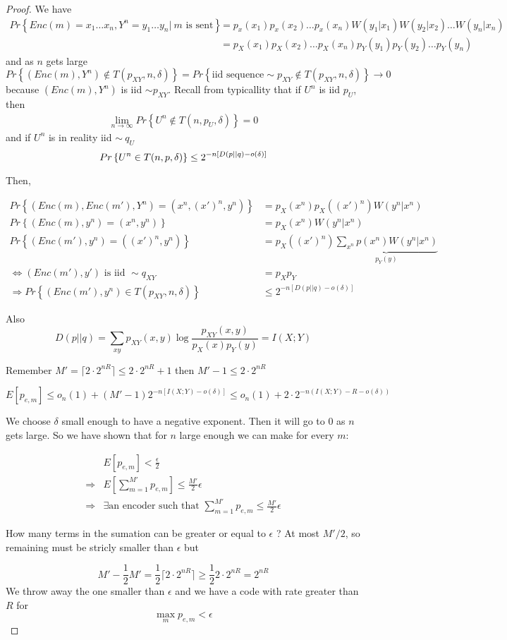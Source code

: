 \documentclass{article}
\theoremstyle{definition} %
\renewcommand{\Pr}[1]{Pr\left\{#1\right\}}
\newcommand{\Ex}[1]{E\left[#1\right]}
\begin{document}
\begin{proof}
  We have
  \begin{align*}
    \Pr{Enc(m) = x_1\dots x_n, Y^n=y_1 \dots y_n |~m \text{ is sent}}
    &= p_x(x_1)p_x(x_2)\dots p_x(x_n)W(y_1|x_1)W(y_2|x_2) \dots W(y_n|x_n) \\
    &= p_X(x_1)p_X(x_2)\dots p_X(x_n)p_Y(y_1)p_Y(y_2)\dots p_Y(y_n)
  \end{align*}
  and as $n$ gets large
  \[
    \Pr{(Enc(m), Y^n) \not \in T (p_{XY}, n, \delta)} = \Pr{\text{iid sequence} \sim p_{XY} \not \in T(p_{XY}, n, \delta)} \to 0
  \]
because $(Enc(m), Y^n)$ is iid $\sim p_{XY}$. Recall from typicallity that if $U^n$ is iid $p_U$, then
\begin{align*}
  \lim_{n\to\infty} \Pr{U^n \not \in T(n, p_U, \delta)} = 0
\end{align*}
and if $U^n$ is in reality iid $\sim~q_U$
\[
  \Pr{U^n \in T(n,p,\delta)} \leq 2^{-n[D(p||q) - o(\delta)]}\\
\]

Then,

\begin{align*}
  \Pr{(Enc(m), Enc(m'), Y^n) = (x^n, (x')^n, y^n)} &= p_X(x^n) p_X((x')^n)W(y^n|x^n)\\
  \Pr{(Enc(m), y^n) = (x^n, y^n)} &= p_X(x^n)W(y^n|x^n)\\
  \Pr{(Enc(m'), y^n) = ((x')^n, y^n)} &= p_X((x')^n) \underbrace{\sum_{x^n} p(x^n)W(y^n|x^n)}_{p_Y(y)}\\
  \iff (Enc(m'), y') \text{ is iid } \sim q_{XY} &= p_Xp_Y\\
  \Rightarrow \Pr{(Enc(m'), y^n) \in T(p_{XY}, n, \delta)} &\leq 2^{-n[D(p||q)- o(\delta)]}
\end{align*}

Also
\[
  D(p||q) = \sum_{xy} p_{XY}(x,y) \log \frac {p_{XY}(x,y)} {p_X(x) p_Y(y)} = I(X;Y)
\]


Remember $M' = \lceil2 \cdot 2^{nR} \rceil \leq 2 \cdot 2^{nR} + 1$ then $M'-1 \leq 2 \cdot 2^{nR}$

\[
  \Ex{p_{e,m}} \leq o_n(1) + (M' -1)  2^{-n[I(X;Y)- o(\delta)]}
  \leq o_n(1) + 2 \cdot 2^{-n(I(X;Y) - R - o(\delta))}
\]

We choose $\delta$ small enough to have a negative exponent. Then it will go to 0 as $n$ gets large. So we have shown that for $n $ large enough we can make for every $m$:

\begin{align*}
  &\Ex{p_{e,m}} < \frac \epsilon 2\\
  \Rightarrow& \Ex{\sum_{m=1}^{M'} p_{e,m}} \leq \frac{M'} 2 \epsilon\\
  \Rightarrow& \exists \text{an encoder such that } \sum_{m=1}^{M'} p_{e,m} \leq \frac{M'} 2 \epsilon
\end{align*}

How many terms in the sumation can be greater or equal to $\epsilon$ ? At most $M'/2$, so remaining must be stricly smaller than $\epsilon$ but

\[
  M' - \frac 1 2 M' = \frac 1 2 \lceil 2 \cdot 2^{nR} \rceil \geq \frac 1 2 2 \cdot 2^{nR} = 2^{nR}
\]
We throw away the one smaller than $\epsilon$ and we have a code with rate greater than $R$ for
\[
  \max_m p_{e,m} < \epsilon
\]
\end{proof}
\end{document}
